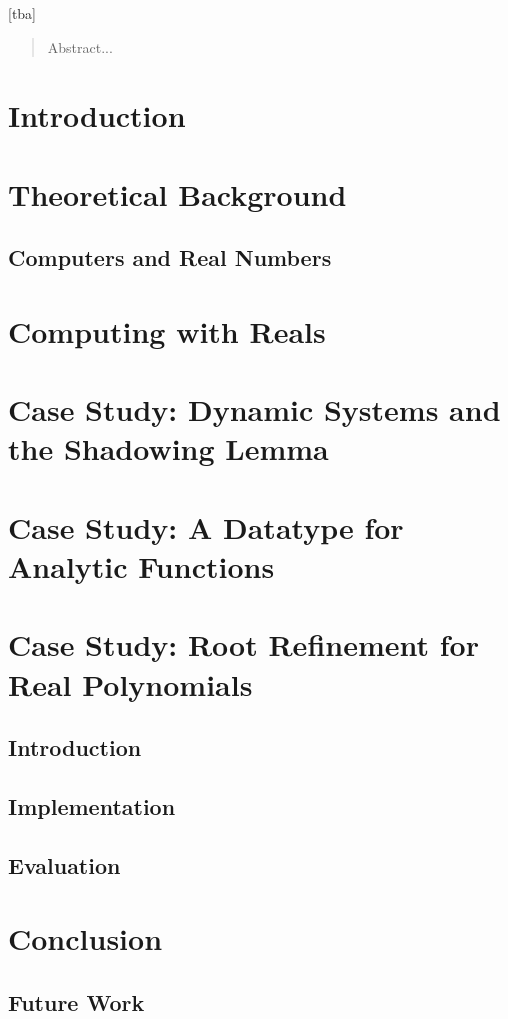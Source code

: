 \documentclass[tudarticle,type=msc,colorback,accentcolor=tud9c]{tudthesis}
\begin{document}
  \author{Holger Thies}
  [tba]
  \dateofexam{\today}{\today}
  \makethesistitle
\dedication{Danksagung...}
\begin{abstract}
    Abstract...
\end{abstract}  
\tableofcontents
  \chapter{Introduction}

  \chapter{Theoretical Background}
  \section{Computers and Real Numbers}
  
  
  \chapter{Computing with Reals}
  
  
  
  
  
  
  \chapter{Case Study: Dynamic Systems and the Shadowing Lemma}
  
  \chapter{Case Study: A Datatype for Analytic Functions}
  
  \chapter{Case Study: Root Refinement for Real Polynomials}
  \section{Introduction}
  \section{Implementation}
  \section{Evaluation}
  \chapter{Conclusion}
  \section{Future Work}
  
\end{document}
